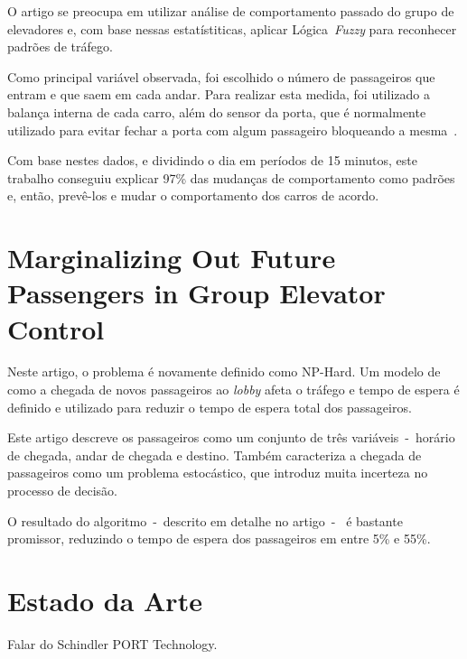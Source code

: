 O artigo  se preocupa em utilizar análise de comportamento passado do grupo de
elevadores e, com base nessas estatístiticas, aplicar Lógica~\textit{Fuzzy} para
reconhecer padrões de tráfego.

Como principal variável observada, foi escolhido o número de passageiros que
entram e que saem em cada andar. Para realizar esta medida, foi utilizado a
balança interna de cada carro, além do sensor da porta, que é normalmente
utilizado para evitar fechar a porta com algum passageiro bloqueando a
mesma~\cite{marja97}.

Com base nestes dados, e dividindo o dia em períodos de 15 minutos, este
trabalho conseguiu explicar 97\% das mudanças de comportamento como padrões e,
então, prevê-los e mudar o comportamento dos carros de acordo.

\section{Marginalizing Out Future Passengers in Group Elevator
Control~\cite{DBLP:journals/corr/abs-1212-2499}}

Neste artigo, o problema é novamente definido como NP-Hard. Um modelo de como a
chegada de novos passageiros ao \textit{lobby} afeta o tráfego e tempo de espera
é definido e utilizado para reduzir o tempo de espera total dos passageiros.

Este artigo descreve os passageiros como um conjunto de três variáveis~-~horário
de chegada, andar de chegada e destino. Também caracteriza a chegada de
passageiros como um problema estocástico, que introduz muita incerteza no
processo de decisão.

O resultado do algoritmo~-~descrito em detalhe no artigo~-~ é bastante promissor,
reduzindo o tempo de espera dos passageiros em entre 5\% e 55\%.

\section{Estado da Arte}

Falar do Schindler PORT Technology.